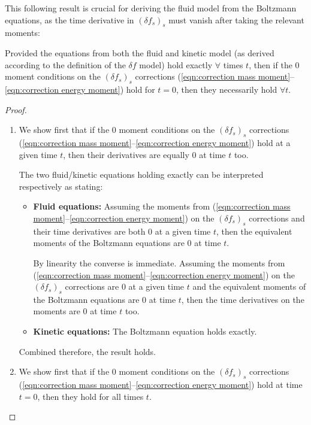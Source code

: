     This following result is crucial for deriving the fluid model from the Boltzmann equations, as the time derivative in $(\delta\!f_{s})_{s}$ must vanish after taking the relevant moments:

    \begin{theorem}
        Provided the equations from both the fluid and kinetic model (as derived according to the definition of the $\delta\! f$ model) hold exactly $\forall$ times $t$, then if the 0 moment conditions on the $(\delta\!f_{s})_{s}$ corrections (\ref{eqn:correction mass moment}--\ref{eqn:correction energy moment}) hold for $t  =  0$, then they necessarily hold $\forall t$.
    \end{theorem}
    \begin{proof}
        \begin{enumerate}
            \item  We show first that if the 0 moment conditions on the $(\delta\!f_{s})_{s}$ corrections (\ref{eqn:correction mass moment}--\ref{eqn:correction energy moment}) hold at a given time $t$, then their derivatives are equally 0 at time $t$ too.
            
            The two fluid/kinetic equations holding exactly can be interpreted respectively as stating:
            \begin{itemize}
                \item  {\bf Fluid equations:} Assuming the moments from (\ref{eqn:correction mass moment}--\ref{eqn:correction energy moment}) on the $(\delta\!f_{s})_{s}$ corrections and their time derivatives are both 0 at a given time $t$, then the equivalent moments of the Boltzmann equations are 0 at time $t$.

                By linearity the converse is immediate. Assuming the moments from (\ref{eqn:correction mass moment}--\ref{eqn:correction energy moment}) on the $(\delta\!f_{s})_{s}$ corrections are 0 at a given time $t$ and the equivalent moments of the Boltzmann equations are 0 at time $t$, then the time derivatives on the moments are 0 at time $t$ too.
                
                \item  {\bf Kinetic equations:} The Boltzmann equation holds exactly.
            \end{itemize}
            Combined therefore, the result holds.
            \item  We show first that if the 0 moment conditions on the $(\delta\!f_{s})_{s}$ corrections (\ref{eqn:correction mass moment}--\ref{eqn:correction energy moment}) hold at time $t  =  0$, then they hold for all times $t$.
            

\end{enumerate}
\end{proof}
